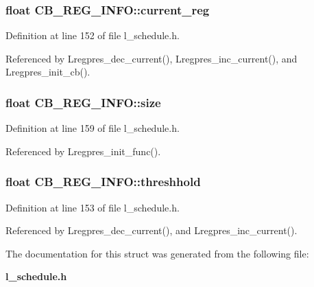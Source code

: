 \subsubsection{\setlength{\rightskip}{0pt plus 5cm}float \bf{CB\_\-REG\_\-INFO::current\_\-reg}}\label{structCB__REG__INFO_2e72cd7897f49a64f88615bd3958c243}




Definition at line 152 of file l\_\-schedule.h.

Referenced by Lregpres\_\-dec\_\-current(), Lregpres\_\-inc\_\-current(), and Lregpres\_\-init\_\-cb().
\subsubsection{\setlength{\rightskip}{0pt plus 5cm}float \bf{CB\_\-REG\_\-INFO::size}}\label{structCB__REG__INFO_cd5f550383f7a5061b76b281d7b62772}




Definition at line 159 of file l\_\-schedule.h.

Referenced by Lregpres\_\-init\_\-func().
\subsubsection{\setlength{\rightskip}{0pt plus 5cm}float \bf{CB\_\-REG\_\-INFO::threshhold}}\label{structCB__REG__INFO_d6cfce5d02a0f868f6ad9c6162513bc2}




Definition at line 153 of file l\_\-schedule.h.

Referenced by Lregpres\_\-dec\_\-current(), and Lregpres\_\-inc\_\-current().

The documentation for this struct was generated from the following file:\begin{CompactItemize}
\item 
\bf{l\_\-schedule.h}\end{CompactItemize}
